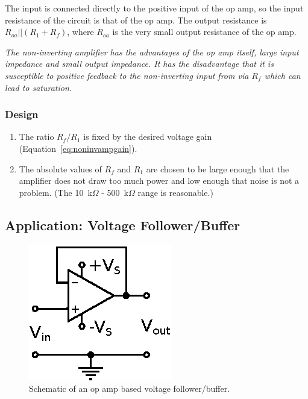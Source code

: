 \documentclass[11pt]{article}
\begin{document}
The input is connected directly to the positive input of the op amp,
so the input resistance of the circuit is that of the op amp. The
output resistance is $R_{oa}||(R_1 + R_f)$, where $R_{oa}$ is the very
small output resistance of the op amp.

\emph{The non-inverting amplifier has the advantages of the op amp
  itself, large input impedance and small output impedance. It has the
  disadvantage that it is susceptible to positive feedback to the
  non-inverting input from via $R_f$ which can lead to saturation.}

\subsubsection*{Design}
\begin{enumerate}
\item The ratio $R_f/R_1$ is fixed by the desired voltage gain
  (Equation~\ref{eq:noninvampgain}).

\item The absolute values of $R_f$ and $R_1$ are chosen to be large enough
  that the amplifier does not draw too much power and low enough that
  noise is not a problem. (The 10~k$\Omega$ - 500~k$\Omega$ range is
  reasonable.)
\end{enumerate}

\subsection{Application: Voltage Follower/Buffer}
\label{sec:vfollower}

\begin{figure}[h!]
  \begin{center}
    \includegraphics{vfollower.eps}
    \caption{Schematic of an op amp based voltage follower/buffer.}
    \label{fig:vfollower}
  \end{center}
\end{figure}
\end{document}
